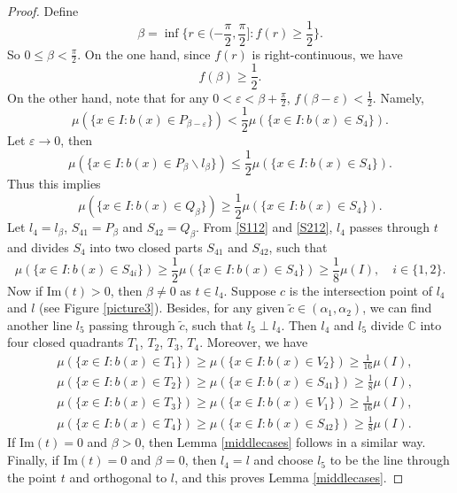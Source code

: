 \documentclass[oneside,english,a4wide]{amsart}
\numberwithin{equation}{section}
\numberwithin{figure}{section}
\theoremstyle{plain}
\theoremstyle{plain}
\theoremstyle{definition}
\theoremstyle{plain}
\theoremstyle{remark}
\theoremstyle{definition}
\theoremstyle{remark}
\theoremstyle{definition}
\newcommand{\8}{\infty}
\begin{document}
\begin{proof}
	Define 
	\begin{equation*}
		\beta=\inf \Big\{r\in (-\frac{\pi}{2},\frac{\pi}{2}]: f(r)\ge \frac{1}{2}\Big\}.
	\end{equation*}
	So $0\leq \beta<\frac{\pi}{2}$. On the one hand, since $f(r)$ is right-continuous, we have 
	\begin{equation}\label{S112}
		f(\beta)\ge \frac{1}{2}.
	\end{equation}
	On the other hand, note that for any $0<\varepsilon<\beta+\frac{\pi}{2}$, $f(\beta-\varepsilon)<\frac{1}{2}$. Namely,
	\begin{equation*}
		\mu(\{x\in I:b(x)\in P_{\beta-\varepsilon}\})<\frac{1}{2}\mu(\{x\in I:b(x)\in S_4\}).
	\end{equation*} 
	Let $\varepsilon\to 0$, then
	\begin{equation*}
		\mu(\{x\in I:b(x)\in P_\beta \backslash l_\beta\})\le \frac{1}{2}\mu(\{x\in I:b(x)\in S_4\}).
	\end{equation*}
Thus this implies
	\begin{equation}\label{S212}
		\mu(\{x\in I:b(x)\in Q_\beta \})\ge \frac{1}{2}\mu(\{x\in I:b(x)\in S_4\}).
	\end{equation}
	Let $l_4=l_\beta$, $S_{41}=P_\beta$ and $S_{42}=Q_\beta$. From \eqref{S112} and \eqref{S212}, $l_4$ passes through $t$ and divides $S_4$ into two closed parts $S_{41}$ and $S_{42}$, such that 
	\begin{equation*}
		\mu(\{x\in I:b(x)\in S_{4i}\})\ge \frac{1}{2}\mu(\{x\in I:b(x)\in S_{4}\})\ge \frac{1}{8}\mu(I),\quad i\in\{1,2\}.
	\end{equation*}
	Now if $\mathrm{Im}(t)>0$, then $\beta\neq 0$ as $t\in l_4$. Suppose $c$ is the intersection point of $l_4$ and $l$ (see Figure \ref{picture3}). Besides, for any given $\tilde{c}\in (\alpha_1,\alpha_2)$, we can find another line $l_5$ passing through $\tilde{c}$, such that $l_5\perp l_4$. Then  $l_4$ and $l_5$ divide $\mathbb{C}$ into four closed quadrants $T_1$, $T_2$, $T_3$, $T_4$. Moreover, we have
	\begin{equation*}
		\begin{aligned}
			{}&\mu(\{x\in I:b(x)\in T_1\})\ge \mu(\{x\in I:b(x)\in V_2\})\ge \frac{1}{16}\mu(I),\\
			&\mu(\{x\in I:b(x)\in T_2\})\ge \mu(\{x\in I:b(x)\in S_{41}\})\ge \frac{1}{8}\mu(I),\\
			&\mu(\{x\in I:b(x)\in T_3\})\ge \mu(\{x\in I:b(x)\in V_1\})\ge \frac{1}{16}\mu(I),\\
			&\mu(\{x\in I:b(x)\in T_4\})\ge \mu(\{x\in I:b(x)\in S_{42}\})\ge \frac{1}{8}\mu(I).			
		\end{aligned}
	\end{equation*}
	If $\mathrm{Im}(t)=0$ and $\beta>0$, then Lemma \ref{middlecases} follows in a similar way. Finally, if $\mathrm{Im}(t)=0$ and $\beta=0$, then $l_4=l$ and choose $l_5$ to be the line through the point $t$ and orthogonal to $l$, and this proves Lemma \ref{middlecases}.
\end{proof}
\end{document}

